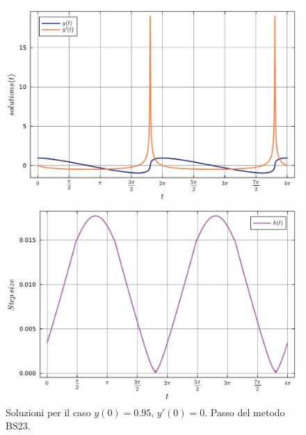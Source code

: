 \documentclass[letterpaper, 12pt]{article}
\numberwithin{equation}{section}    %
\begin{document}
\begin{figure}[!ht]
    \centering
    \begin{minipage}[b]{0.47\textwidth}
        \includegraphics[width=\textwidth]{6367.pdf}
    \end{minipage}
    \hspace{0.5cm}
    \begin{minipage}[b]{0.47\textwidth}
        \includegraphics[width=\textwidth]{6368.pdf}
    \end{minipage}
    \caption{Soluzioni per il caso $y(0) = 0.95$, $y'(0) = 0$. Passo del metodo BS23.}
    \label{fig:es6_3_6_4}
\end{figure}
\end{document}
